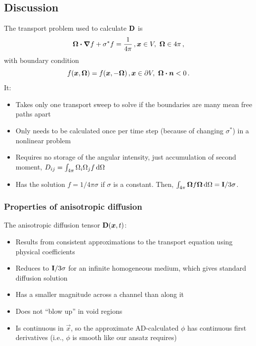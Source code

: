 \documentclass{beamer}
\begin{document}
\subsection{Discussion}
\begin{frame}
  The transport problem used to calculate $\mathbf{D}$ is
  \begin{equation*}
    \bm{\Omega}\bm{\cdot} \bm{\nabla} f + \sigma^* f = \frac{1}{4\pi} \,, \bm{x} \in V,\
    \bm{\Omega}\in 4\pi\,,
  \end{equation*}
  with boundary condition
  \begin{equation*}
    f(\bm{x}, \bm{\Omega}) = f(\bm{x}, -\bm{\Omega}) \,, \bm{x} \in
    \partial V,\ \bm{\Omega} \bm{\cdot} \bm{n} < 0\,.
  \end{equation*}
  It:
  \begin{itemize}
    \item Takes only one transport sweep to solve if the boundaries are many
      mean free paths apart
    \item Only needs to be calculated once per time step (because of changing
      $\sigma^*$) in a nonlinear problem \item Requires no storage of the
      angular intensity, just accumulation of second moment, $D_{ij} =
      \int_{4\pi} \Omega_i \Omega_j f \mathop{}\!\mathrm{d} \Omega$
    \item Has the solution $f=1/4\pi\sigma$ if $\sigma$ is a constant.
      Then, $\int_{4\pi} \bm{\Omega} f \bm{\Omega} \mathop{}\!\mathrm{d} \Omega =
      \mathbf{I}/3\sigma$.
  \end{itemize}
\end{frame}

\begin{frame}
  \frametitle{Properties of anisotropic diffusion}

  The anisotropic diffusion tensor $\mathbf{D}(\bm{x},t)$: 
  \begin{itemize}
    \item Results from consistent approximations to the transport equation
      using physical coefficients
    \item Reduces to $\mathbf{I}/3\sigma$ for an infinite homogeneous
      medium, which gives standard diffusion solution
    \item Has a smaller magnitude across a channel than along it
    \item Does not ``blow up'' in void regions
    \item Is continuous in $\vec{x}$, so the approximate AD-calculated $\phi$
      has continuous first derivatives (i.e., $\phi$ is smooth like our ansatz
      requires)
  \end{itemize}
\end{frame}
\end{document}

